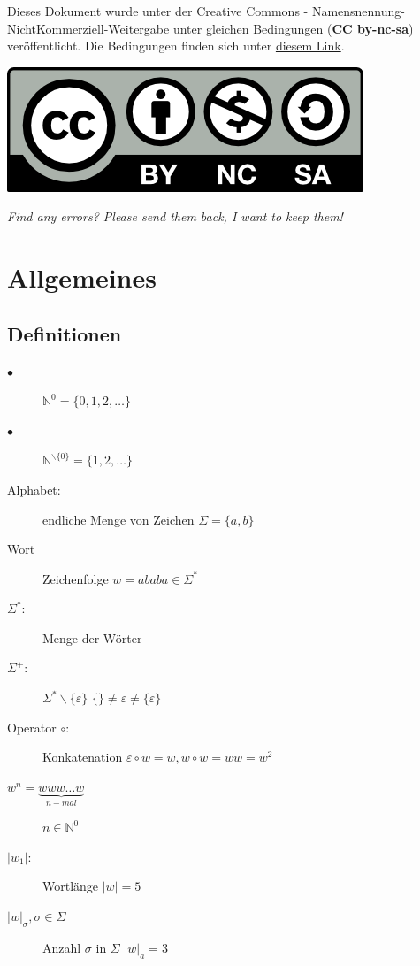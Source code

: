 \documentclass{scrartcl}
\begin{document}

\begin{shaded}
Dieses Dokument wurde unter der Creative Commons - Namensnennung-NichtKommerziell-Weitergabe unter gleichen Bedingungen (\textbf{CC by-nc-sa}) veröffentlicht. Die Bedingungen finden sich unter \href{http://creativecommons.org/licenses/by-nc-sa/3.0/de}{diesem Link}. \\
\centerline{\includegraphics[scale=1]{../cc-by-nc-sa.png} }
\end{shaded}

\textit{Find any errors? Please send them back, I want to keep them!}

\section*{Allgemeines}
\subsection*{Definitionen}
\begin{description}
    \item[$\bullet$] $\mathds{N}^0 = \{0,1,2,\dots\}$
    \item[$\bullet$] $\mathds{N}^{\backslash\{0\}}=\{1,2,\dots\}$
    \item[Alphabet:] endliche Menge von Zeichen {\tiny $\Sigma=\{a,b\}$}
    \item[Wort] Zeichenfolge {\tiny $w=ababa \in\Sigma^*$}
    \item[$\Sigma^*$:] Menge der Wörter
    \item[$\Sigma^+$:] $\Sigma^* \backslash\{\varepsilon\}$ {\tiny $\{\}\not= \varepsilon \not=\{\varepsilon\}$}
    \item[Operator $\circ$:]Konkatenation {\tiny $\varepsilon \circ w = w, w\circ w=ww=w^2$}
    \item[$w^n=\underset{n-mal}{\underbrace{www\dots w}}$] $n \in \mathds{N}^0$
    \item[$|w_1|$:] Wortlänge {\tiny $|w|=5$}
    \item[$|w|_\sigma, \sigma\in\Sigma$] Anzahl $\sigma$ in $\Sigma$ {\tiny $|w|_a=3$}
\end{description}
\end{document}
